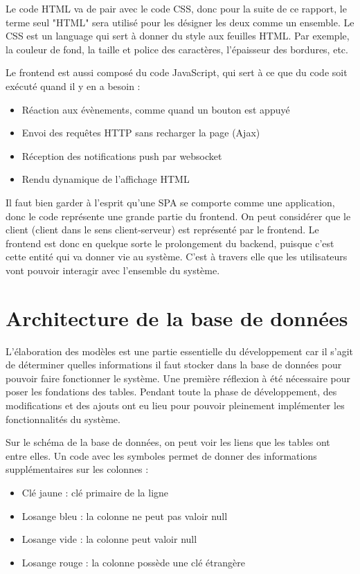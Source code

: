 \documentclass[
    iai, %
    eai, %
]{heig-tb}
\begin{document}
Le code HTML va de pair avec le code CSS, donc pour la suite de ce rapport, le terme seul "HTML" sera utilisé pour les désigner les deux comme un ensemble.
Le CSS est un language qui sert à donner du style aux feuilles HTML. Par exemple, la couleur de fond, la taille et police des caractères, l'épaisseur des bordures, etc.

Le frontend est aussi composé du code JavaScript, qui sert à ce que du code soit exécuté quand il y en a besoin :
\begin{itemize}
  \item Réaction aux évènements, comme quand un bouton est appuyé
  \item Envoi des requêtes HTTP sans recharger la page (Ajax)
  \item Réception des notifications push par websocket
  \item Rendu dynamique de l'affichage HTML
\end{itemize}
\bigskip

Il faut bien garder à l'esprit qu'une SPA se comporte comme une application, donc le code représente une grande partie du frontend.
On peut considérer que le client (client dans le sens client-serveur) est représenté par le frontend. Le frontend est donc en quelque sorte le prolongement du backend, puisque c'est cette entité qui va donner vie au système. C'est à travers elle que les utilisateurs vont pouvoir interagir avec l'ensemble du système.

\chapter{Architecture de la base de données}
\label{chapter:database}
L'élaboration des modèles est une partie essentielle du développement car il s'agit de déterminer quelles informations il faut stocker dans la base de données pour pouvoir faire fonctionner le système. Une première réflexion à été nécessaire pour poser les fondations des tables. Pendant toute la phase de développement, des modifications et des ajouts ont eu lieu pour pouvoir pleinement implémenter les fonctionnalités du système.
\newpage

Sur le schéma de la base de données, on peut voir les liens que les tables ont entre elles. Un code avec les symboles permet de donner des informations supplémentaires sur les colonnes :
\begin{itemize}
  \item Clé jaune : clé primaire de la ligne
  \item Losange bleu : la colonne ne peut pas valoir null
  \item Losange vide : la colonne peut valoir null
  \item Losange rouge : la colonne possède une clé étrangère
\end{itemize}
\bigskip
\end{document}
